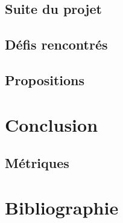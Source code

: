 \documentclass{EPL-master-thesis-covers-FR}
\begin{document}
		\section{Suite du projet}
			\label{ref:suite_projet}

		

		\section{Défis rencontrés}

			

		\section{Propositions}

			
	\chapter{Conclusion}

		

		\section{Métriques}
		

	\chapter{Bibliographie}

		
		
		

	

	\setlength{\parskip}{0em}
	\backcoverpage
\end{document}
